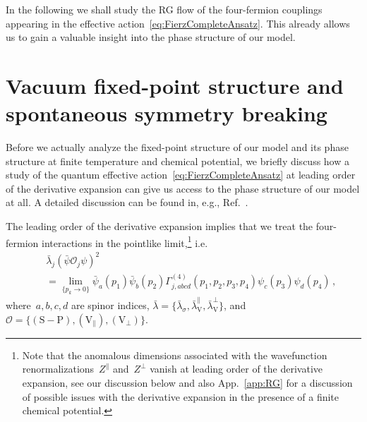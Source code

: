 \documentclass[prd,english,preprintnumbers,amsmath,amssymb,nofootinbib,twocolumn,superscriptaddress]{revtex4-1}
\newcommand{\be}{\begin{eqnarray}}
\newcommand{\ee}{\end{eqnarray}}
\newcommand{\nn}{\nonumber }
\begin{document}
{In the following we shall study the RG flow of the four-fermion couplings appearing in the effective action~\eqref{eq:FierzCompleteAnsatz}.
This already allows us to gain a valuable insight into the phase structure of our model.

%
\section{Vacuum fixed-point structure and spontaneous symmetry breaking}\label{sec:fpsb}
%

Before we actually analyze the fixed-point structure of our model and its phase structure at finite temperature
and chemical potential, we briefly discuss how a study of the quantum effective action~\eqref{eq:FierzCompleteAnsatz}
at leading order of the derivative expansion can give us access to the phase structure of our model at all. A detailed discussion
can be found in, e.g., Ref.~\cite{Braun:2011pp}. 

{The leading order} of the derivative expansion implies that we treat the four-fermion interactions in the 
pointlike limit,\footnote{Note that the anomalous dimensions associated with the wavefunction renormalizations~$Z^{\parallel}$
and~$Z^{\perp}$ vanish at leading order of the derivative expansion, see our discussion below and also App.~\ref{app:RG} for a 
discussion of possible issues with the derivative expansion in the presence of a finite chemical potential.} i.e. 
%
\be
&&\!\bar{\lambda}_j (\bar{\psi}{\mathcal O}_j\psi)^2  \nn\\ 
&& =\! \lim_{\{p_k\to 0\}} \!
\bar{\psi}_a(p_1)\bar{\psi}_b(p_2)\Gamma^{(4)}_{j,abcd}(p_1,p_2,p_3,p_4)\psi_c(p_3)\psi_d(p_4)\,,\nn
\ee
%
where~$a, b, c, d$ are spinor indices, ${\bar{\lambda}}=\{\bar{\lambda}_{\sigma},\bar{\lambda}_{\text{V}}^{\parallel},\bar{\lambda}_{\text{V}}^{\perp}\}$, 
and~${\mathcal O} = \{(\text{S}-\text{P}),\left(\text{V}_{\parallel}\right),\left(\text{V}_{\perp}\right)\}$. 

}
\end{document}
